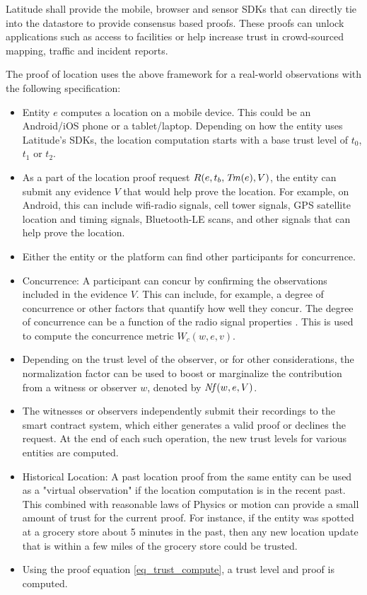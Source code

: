 Latitude shall provide the mobile, browser and sensor SDKs that can directly tie into the datastore to provide consensus
based proofs. These proofs can unlock applications such as access to facilities or help increase trust in crowd-sourced
mapping, traffic and incident reports.

The proof of location uses the above framework for a real-world observations with the following specification:
\begin{itemize}
    \item Entity $e$ computes a location on a mobile device. This could be an Android/iOS phone or a tablet/laptop.
        Depending on how the entity uses Latitude's SDKs, the location computation starts with a base trust level of
        $t_0$, $t_1$ or $t_2$.
    \item As a part of the location proof request $R(e, t_b, \mathit{Tm}(e), V)$, the entity can submit any evidence $V$ that would help
        prove the location. For example, on Android, this can include wifi-radio signals, cell tower signals, GPS
        satellite location and timing signals, Bluetooth-LE scans, and other signals that can help prove the location.
    \item Either the entity or the platform can find other participants for concurrence.
    \item Concurrence: A participant can concur by confirming the observations included in the evidence $V$. This can
        include, for example, a degree of concurrence or other factors that quantify how well they concur. The degree of
        concurrence can be a function of the radio signal properties \cite{mishra_secure, Mathur_2011}. This is used to
        compute the concurrence metric $W_c(w, e, v)$.
    \item Depending on the trust level of the observer, or for other considerations, the normalization factor can be
        used to boost or marginalize the contribution from a witness or observer $w$, denoted by $\mathit{Nf}(w, e, V)$.
    \item The witnesses or observers independently submit their recordings to the smart contract system, which either
        generates a valid proof or declines the request. At the end of each such operation, the new trust levels for
        various entities are computed.
    \item Historical Location: A past location proof from the same entity can be used as a "virtual observation" if the
        location computation is in the recent past. This combined with reasonable laws of Physics or motion can provide
        a small amount of trust for the current proof. For instance, if the entity was spotted at a grocery store about
        5 minutes in the past, then any new location update that is within a few miles of the grocery store could be trusted.
    \item Using the proof equation \ref{eq_trust_compute}, a trust level and proof is computed.
\end{itemize}

